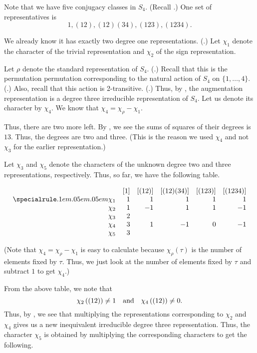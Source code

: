 \begin{ex}
	Note that we have five conjugacy classes in $S_4.$ (Recall .) One set of representatives is
	\begin{equation*} 
		1, (12), (12)(34), (123), (1234).
	\end{equation*}

	We already know it has exactly two degree one representations. (.) Let $\chi_1$ denote the character of the trivial representation and $\chi_2$ of the sign representation.

	Let $\rho$ denote the standard representation of $S_4.$ (.) Recall that this is the permutation permutation corresponding to the natural action of $S_4$ on $\{1, \ldots, 4\}.$ (.) Also, recall that this action is 2-transitive. (.) Thus, by , the augmentation representation is a degree three irreducible representation of $S_4.$ Let us denote its character by $\chi_4.$ We know that $\chi_4 = \chi_\rho - \chi_1.$

	Thus, there are two more left. By , we see the sums of squares of their degrees is $13.$ Thus, the degrees are two and three. (This is the reason we used $\chi_4$ and not $\chi_3$ for the earlier representation.)

	Let $\chi_3$ and $\chi_5$ denote the characters of the unknown degree two and three representations, respectively. Thus, so far, we have the following table.

	\[\begin{array}{rrrrrr}
		 & [1] & [(12)] & [(12)(34)] & [(123)] & [(1234)]\\
		\thiccline
		\chi_1 & 1 &  1 & 1  &  1 &  1 \\
		\chi_2 & 1 & -1 & 1  &  1 & -1 \\
		\chi_3 & 2 &    &    &    &    \\
		\chi_4 & 3 &  1 & -1 &  0 & -1 \\
		\chi_5 & 3 &    &    &    &    \\
	\end{array}\]

	(Note that $\chi_4 = \chi_\rho - \chi_1$ is easy to calculate because $\chi_\rho(\tau)$ is the number of elements fixed by $\tau.$ Thus, we just look at the number of elements fixed by $\tau$ and subtract $1$ to get $\chi_4.$)

	From the above table, we note that
	\begin{equation*} 
		\chi_2\left((12)\right) \neq 1 \quad\text{and}\quad \chi_4\left((12)\right) \neq 0.
	\end{equation*}
	Thus, by , we see that multiplying the representations corresponding to $\chi_2$ and $\chi_4$ gives us a new inequivalent irreducible degree three representation. Thus, the character $\chi_5$ is obtained by multiplying the corresponding characters to get the following.


\end{ex}
